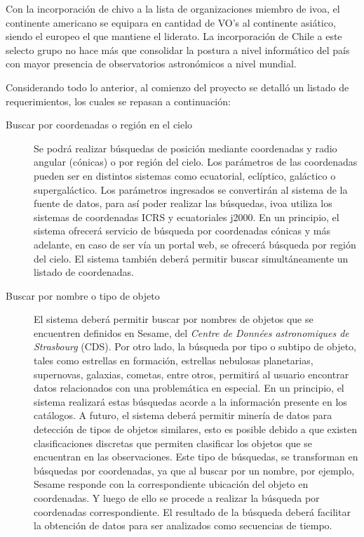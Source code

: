Con la incorporación de \gls{chivo} a la lista de organizaciones miembro de \gls{ivoa}, el continente americano se equipara en cantidad de VO's al continente asiático\footnotemark{}, siendo el europeo el que mantiene el liderato. La incorporación de Chile a este selecto grupo no hace más que consolidar la postura a nivel informático del país con mayor presencia de observatorios astronómicos a nivel mundial.


Considerando todo lo anterior, al comienzo del proyecto se detalló un listado de requerimientos, los cuales se repasan a continuación:

\begin{description}
	\item[Buscar por coordenadas o región en el cielo] Se podrá realizar búsquedas de posición mediante coordenadas y radio angular (cónicas) o por	región del cielo. Los parámetros de las coordenadas pueden ser en distintos sistemas como ecuatorial, eclíptico, galáctico o supergaláctico. Los parámetros ingresados se convertirán al sistema de la fuente de datos, para así poder realizar las búsquedas, \gls{ivoa} utiliza los sistemas de coordenadas ICRS y ecuatoriales \gls{j2000}. En un principio, el sistema ofrecerá servicio de búsqueda por coordenadas cónicas y más adelante, en caso de ser vía un portal web, se ofrecerá búsqueda por región del cielo. El sistema tambi\'en deberá permitir buscar simultáneamente un listado de coordenadas.
	\item[Buscar por nombre o tipo de objeto] El sistema deberá permitir buscar por nombres de objetos que se encuentren definidos en Sesame, del \emph{Centre de Donn\'ees astronomiques de Strasbourg} (CDS). Por otro lado, la búsqueda por tipo o subtipo de objeto, tales como estrellas en formación, estrellas nebulosas planetarias, supernovas, galaxias, cometas, entre otros, permitirá al usuario encontrar datos relacionados con una problemática en especial. En un principio, el sistema realizará estas búsquedas acorde a la información presente en los catálogos. A futuro, el sistema deberá permitir minería de datos para detección de tipos de objetos similares, esto es posible debido a que existen clasificaciones discretas que permiten clasificar los objetos que se encuentran en las observaciones. Este tipo de búsquedas, se transforman en búsquedas por coordenadas, ya que al buscar por un nombre, por ejemplo, Sesame responde con la correspondiente ubicación del objeto en coordenadas. Y luego de ello se procede a realizar la búsqueda por coordenadas correspondiente. El resultado de la búsqueda deberá facilitar la obtención de datos para ser analizados como secuencias de tiempo.

\end{description}

